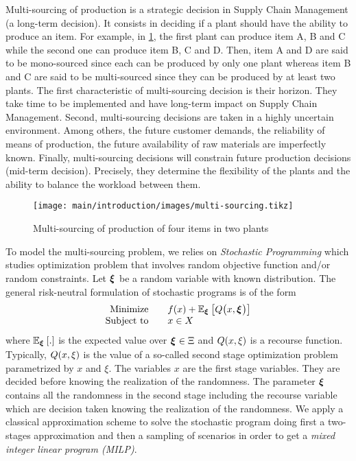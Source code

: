 Multi-sourcing of production is a strategic decision in Supply Chain Management (\ie a long-term decision).
It consists in deciding if a plant should have the ability to produce an item.
For example, in \cref{fig:intro:en:multi-sourcing}, the first plant can produce item A, B and C while the second one can produce item B, C and D.
Then, item A and D are said to be mono-sourced since each can be produced by only one plant whereas item B and C are said to be multi-sourced since they can be produced by at least two plants.
The first characteristic of multi-sourcing decision is their horizon.
They take time to be implemented and have long-term impact on Supply Chain Management.
Second, multi-sourcing decisions are taken in a highly uncertain environment.
Among others, the future customer demands, the reliability of means of production, the future availability of raw materials are imperfectly known.
Finally, multi-sourcing decisions will constrain future production decisions (\ie mid-term decision).
Precisely, they determine the flexibility of the plants and the ability to balance the workload between them.


\begin{figure}[!ht]
  \centering
  \texttt{[image: main/introduction/images/multi-sourcing.tikz]}
  \caption{Multi-sourcing of production of four items in two plants}
  \label{fig:intro:en:multi-sourcing}
\end{figure}


\medskip


To model the multi-sourcing problem, we relies on \emph{Stochastic Programming} which studies optimization problem that involves random objective function and/or random constraints.
Let $\va \xi$ be a random variable with known distribution.
The general risk-neutral formulation of stochastic programs is of the form
\begin{equation}
\begin{array}{rl}
  \mbox{Minimize} \quad & f(x) + \espe_{\va\xi}\sqbracket{Q\bracket{x,\va\xi}} \\
  \mbox{Subject to} \quad & x \in X
\end{array}
\end{equation}
where $\espe_{\va\xi}\sqbracket{.}$ is the expected value over $\va\xi\in\Xi$ and $Q\bracket{x,\xi}$ is a recourse function.
Typically, $Q\bracket{x,\xi}$ is the value of a so-called second stage optimization problem parametrized by $x$ and $\xi$.
The variables $x$ are the first stage variables.
They are decided before knowing the realization of the randomness.
The parameter $\va\xi$ contains all the randomness in the second stage including the recourse variable which are decision taken knowing the realization of the randomness.
We apply a classical approximation scheme to solve the stochastic program doing first a two-stages approximation and then a sampling of scenarios in order to get a \emph{mixed integer linear program (MILP)}.


